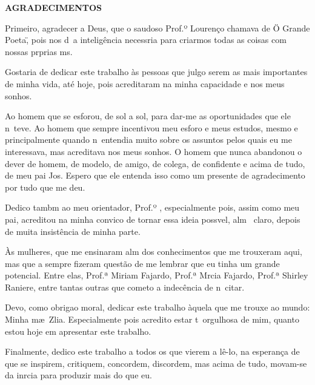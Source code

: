
\label{tcc:agradecimentos}

\begin{center}
\textbf{AGRADECIMENTOS}
\end{center}

Primeiro, agradecer a Deus, que o saudoso Prof.º Lourenço chamava de \"O Grande Poeta\", pois nos d\ah\ a intelig\^encia necess\ah ria para criarmos todas as coisas com nossas pr\oh prias m\ao s.

Gostaria de dedicar este trabalho \`as pessoas que julgo serem as mais importantes de minha vida, at\'e hoje, pois acreditaram na minha capacidade e nos meus sonhos.

Ao homem que se esfor\cc ou, de sol a sol, para dar-me as oportunidades que ele n\ao\ teve. Ao homem que sempre incentivou meu esfor\cc o e meus estudos, mesmo e principalmente quando n\ao\ entendia muito sobre os assuntos pelos quais eu me interessava, mas acreditava nos meus sonhos. O homem que nunca abandonou o dever de homem, de modelo, de amigo, de colega, de confidente e acima de tudo, de meu pai Jos\eh . Espero que ele entenda isso como um presente de agradecimento por tudo que me deu.

Dedico tamb\eh m ao meu orientador, Prof.º \ORIENTADOR, especialmente pois, assim como meu pai, acreditou na minha convic\ca o de tornar essa ideia poss\ih vel, al\eh m \eh\ claro, depois de muita insist\^encia de minha parte.

\`{A}s mulheres, que me ensinaram al\eh m dos conhecimentos que me trouxeram aqui, mas que a
sempre fizeram quest\~ao de me lembrar que eu tinha um grande potencial. Entre elas, Prof.ª Miriam Fajardo, Prof.ª M\ah rcia Fajardo, Prof.ª Shirley Raniere, entre tantas outras que cometo a indec\^encia de n\ao\ citar.

Devo, como obriga\ca o moral, dedicar este trabalho \`aquela que me trouxe ao mundo: Minha m\ae\ Z\eh lia. Especialmente pois acredito estar t\ao\ orgulhosa de mim, quanto estou hoje em apresentar este trabalho.

Finalmente, dedico este trabalho a todos os que vierem a l\^e-lo, na esperança de que se inspirem, critiquem, concordem, discordem, mas acima de tudo, movam-se da in\eh rcia para produzir mais do que eu.
